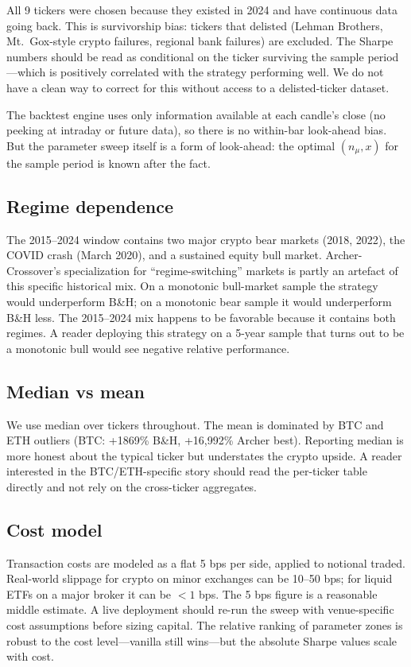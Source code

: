 \documentclass[11pt,a4paper]{article}
\begin{document}
All 9 tickers were chosen because they existed in 2024 and have continuous data going back. This is survivorship bias: tickers that delisted (Lehman Brothers, Mt.\ Gox-style crypto failures, regional bank failures) are excluded. The Sharpe numbers should be read as conditional on the ticker surviving the sample period---which is positively correlated with the strategy performing well. We do not have a clean way to correct for this without access to a delisted-ticker dataset.

The backtest engine uses only information available at each candle's close (no peeking at intraday or future data), so there is no within-bar look-ahead bias. But the parameter sweep itself is a form of look-ahead: the optimal $(n_\mu, x)$ for the sample period is known after the fact.

\subsection{Regime dependence}

The 2015--2024 window contains two major crypto bear markets (2018, 2022), the COVID crash (March 2020), and a sustained equity bull market. Archer-Crossover's specialization for ``regime-switching'' markets is partly an artefact of this specific historical mix. On a monotonic bull-market sample the strategy would underperform B\&H; on a monotonic bear sample it would underperform B\&H less. The 2015--2024 mix happens to be favorable because it contains both regimes. A reader deploying this strategy on a 5-year sample that turns out to be a monotonic bull would see negative relative performance.

\subsection{Median vs mean}

We use median over tickers throughout. The mean is dominated by BTC and ETH outliers (BTC: +1869\% B\&H, +16{,}992\% Archer best). Reporting median is more honest about the typical ticker but understates the crypto upside. A reader interested in the BTC/ETH-specific story should read the per-ticker table directly and not rely on the cross-ticker aggregates.

\subsection{Cost model}

Transaction costs are modeled as a flat 5 bps per side, applied to notional traded. Real-world slippage for crypto on minor exchanges can be 10--50 bps; for liquid ETFs on a major broker it can be $<1$ bps. The 5 bps figure is a reasonable middle estimate. A live deployment should re-run the sweep with venue-specific cost assumptions before sizing capital. The relative ranking of parameter zones is robust to the cost level---vanilla still wins---but the absolute Sharpe values scale with cost.
\end{document}
